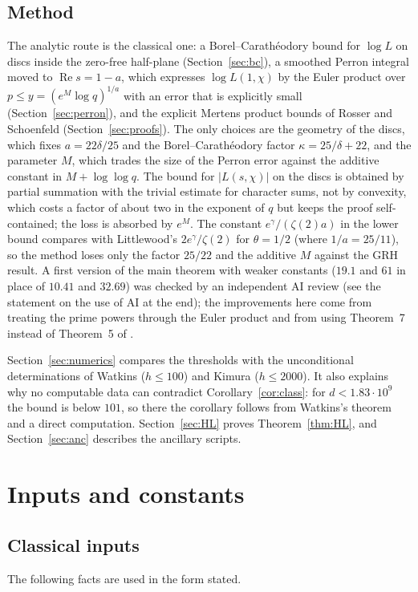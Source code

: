 \documentclass[11pt]{article}
\theoremstyle{definition}
\theoremstyle{remark}
\numberwithin{equation}{section}
\newcommand{\Rea}{\operatorname{Re}}
\begin{document}
\subsection*{Method}
The analytic route is the classical one: a Borel--Carath\'eodory bound for $\log L$ on discs inside the zero-free half-plane (Section~\ref{sec:bc}), a smoothed Perron integral moved to $\Rea s=1-a$, which expresses $\log L(1,\chi)$ by the Euler product over $p\le y=(e^M\log q)^{1/a}$ with an error that is explicitly small (Section~\ref{sec:perron}), and the explicit Mertens product bounds of Rosser and Schoenfeld (Section~\ref{sec:proofs}). The only choices are the geometry of the discs, which fixes $a=22\delta/25$ and the Borel--Carath\'eodory factor $\kappa=25/\delta+22$, and the parameter $M$, which trades the size of the Perron error against the additive constant in $M+\log\log q$. The bound for $|L(s,\chi)|$ on the discs is obtained by partial summation with the trivial estimate for character sums, not by convexity, which costs a factor of about two in the exponent of $q$ but keeps the proof self-contained; the loss is absorbed by $e^{M}$. The constant $e^{\gamma}/(\zeta(2)a)$ in the lower bound compares with Littlewood's $2e^{\gamma}/\zeta(2)$ for $\theta=1/2$ (where $1/a=25/11$), so the method loses only the factor $25/22$ and the additive $M$ against the GRH result. A first version of the main theorem with weaker constants ($19.1$ and $61$ in place of $10.41$ and $32.69$) was checked by an independent AI review (see the statement on the use of AI at the end); the improvements here come from treating the prime powers through the Euler product and from using Theorem~7 instead of Theorem~5 of \cite{rs1962}.

Section~\ref{sec:numerics} compares the thresholds with the unconditional determinations of Watkins \cite{watkins2004} ($h\le100$) and Kimura \cite{kimura2026} ($h\le2000$). It also explains why no computable data can contradict Corollary~\ref{cor:class}: for $d<1.83\cdot10^9$ the bound is below $101$, so there the corollary follows from Watkins's theorem and a direct computation. Section~\ref{sec:HL} proves Theorem~\ref{thm:HL}, and Section~\ref{sec:anc} describes the ancillary scripts.

\section{Inputs and constants}\label{sec:inputs}

\subsection{Classical inputs}\label{sec:classical}
The following facts are used in the form stated.
\end{document}
